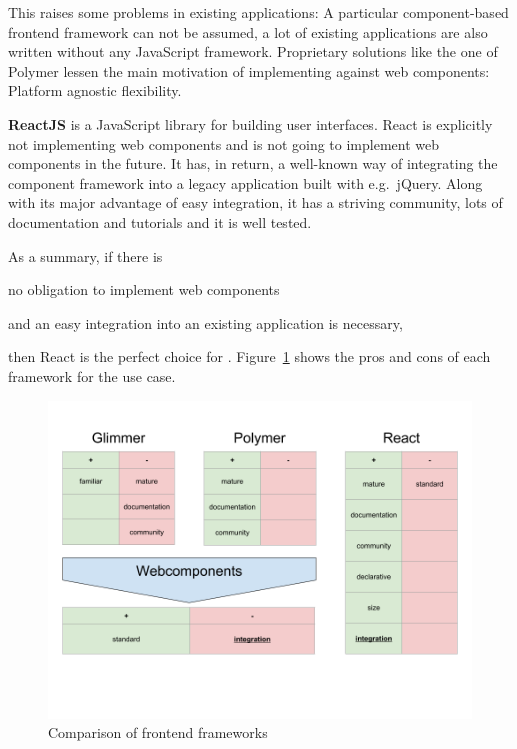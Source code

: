 



This raises some problems in existing applications:
A particular component-based frontend framework can not be assumed, a lot of existing applications are also written without any JavaScript framework.
Proprietary solutions like the one of Polymer lessen the main motivation of implementing against web components:
Platform agnostic flexibility.

\textbf{ReactJS} is a JavaScript library for building user interfaces\cite{React2017}.
React is explicitly not implementing web components and is not going to implement web components in the future.
It has, in return, a well-known way of integrating the component framework into a legacy application built with e.g.\ jQuery.
Along with its major advantage of easy integration, it has a striving community, lots of documentation and tutorials and it is well tested.

As a summary, if there is
\begin{enumerate*}[label=(\arabic*)]
  \item no obligation to implement web components
  \item and an easy integration into an existing application is necessary,
\end{enumerate*}
then React is the perfect choice for \cmvs{}.
Figure~\ref{fig:implementation:frontend-frameworks} shows the pros and cons of each framework for the use case.


\begin{figure}[h!]
  \centering
  \includegraphics[width=\textwidth]{images/frontend-frameworks.png}
  \caption{Comparison of frontend frameworks}\label{fig:implementation:frontend-frameworks}
\end{figure}

